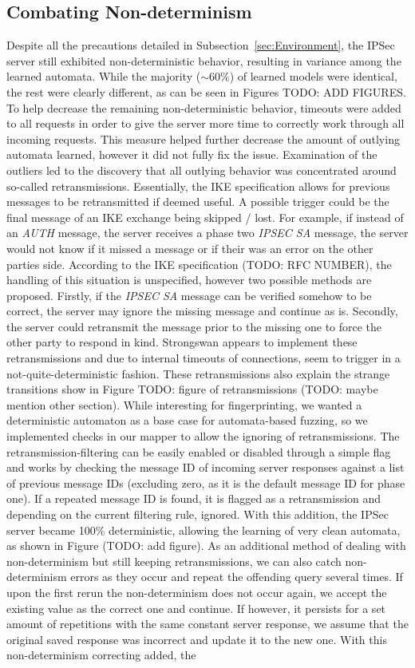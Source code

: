 \subsection{Combating Non-determinism}
Despite all the precautions detailed in Subsection~\ref{sec:Environment}, the IPSec server still exhibited non-deterministic behavior, resulting in variance among the learned automata. While the majority ($\sim$60\%) of learned models were identical, the rest were clearly different, as can be seen in Figures TODO: ADD FIGURES. To help decrease the remaining non-deterministic behavior, timeouts were added to all requests in order to give the server more time to correctly work through all incoming requests. This measure helped further decrease the amount of outlying automata learned, however it did not fully fix the issue. Examination of the outliers led to the discovery that all outlying behavior was concentrated around so-called retransmissions. Essentially, the IKE specification allows for previous messages to be retransmitted if deemed useful. A possible trigger could be the final message of an IKE exchange being skipped / lost. For example, if instead of an \emph{AUTH} message, the server receives a phase two \emph{IPSEC SA} message, the server would not know if it missed a message or if their was an error on the other parties side. According to the IKE specification (TODO: RFC NUMBER), the handling of this situation is unspecified, however two possible methods are proposed. Firstly, if the \emph{IPSEC SA} message can be verified somehow to be correct, the server may ignore the missing message and continue as is. Secondly, the server could retransmit the message prior to the missing one to force the other party to respond in kind. Strongswan appears to implement these retransmissions and due to internal timeouts of connections, seem to trigger in a not-quite-deterministic fashion. These retransmissions also explain the strange transitions show in Figure TODO: figure of retransmissions (TODO: maybe mention other section). While interesting for fingerprinting, we wanted a deterministic automaton as a base case for automata-based fuzzing, so we implemented checks in our mapper to allow the ignoring of retransmissions. The retransmission-filtering can be easily enabled or disabled through a simple flag and works by checking the message ID of incoming server responses against a list of previous message IDs (excluding zero, as it is the default message ID for phase one). If a repeated message ID is found, it is flagged as a retransmission and depending on the current filtering rule, ignored. With this addition, the IPSec server became 100\% deterministic, allowing the learning of very clean automata, as shown in Figure (TODO: add figure). As an additional method of dealing with non-determinism but still keeping retransmissions, we can also catch non-determinism errors as they occur and repeat the offending query several times. If upon the first rerun the non-determinism does not occur again, we accept the existing value as the correct one and continue. If however, it persists for a set amount of repetitions with the same constant server response, we assume that the original saved response was incorrect and update it to the new one. With this non-determinism correcting added, the 